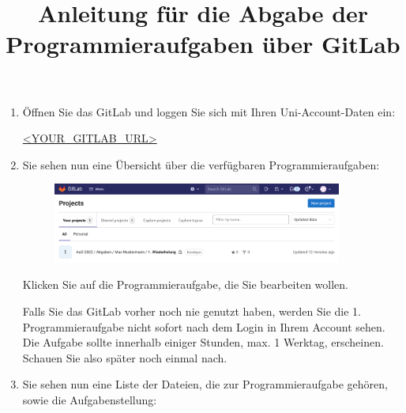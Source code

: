 \documentclass{scrartcl}
\title{\vspace{-2cm}Anleitung für die Abgabe der Programmieraufgaben über GitLab}
\begin{document}
	\maketitle
	
	\begin{enumerate}
		\item Öffnen Sie das GitLab und loggen Sie sich mit Ihren Uni-Account-Daten ein:
		
		\vfill
		
		\url{<YOUR_GITLAB_URL>} %
		
		\vfill
	
		\item Sie sehen nun eine Übersicht über die verfügbaren Programmieraufgaben:
		
		\vfill
		
		\begin{figure}[h!]
			\centering
			\includegraphics[width=0.9\textwidth]{img/de/screenshot-project-overview.png}
		\end{figure}
		
		\vfill

		Klicken Sie auf die Programmieraufgabe, die Sie bearbeiten wollen.
		
		\vfill

		\begin{tcolorbox}[title=\faLightbulbO\space Hinweis,colbacktitle=hintboxcolor,colframe=hintboxcolor]
			Falls Sie das GitLab vorher noch nie genutzt haben, werden Sie die 1. Programmieraufgabe nicht sofort nach dem Login in Ihrem Account sehen. Die Aufgabe sollte innerhalb einiger Stunden, max. 1 Werktag, erscheinen. Schauen Sie also später noch einmal nach.
		\end{tcolorbox}
		
		\vspace{6cm}
		
		\newpage
		
		\item Sie sehen nun eine Liste der Dateien, die zur Programmieraufgabe gehören, sowie die Aufgabenstellung:
		
		\vfill
		

\end{enumerate}
\end{document}
